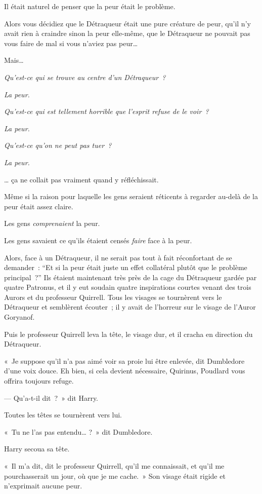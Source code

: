 Il était naturel de penser que la peur était le problème.

Alors vous décidiez que le Détraqueur était une pure créature de peur, qu'il n'y avait rien à craindre sinon la peur elle-même, que le Détraqueur ne pouvait pas vous faire de mal si vous n'aviez pas peur…

Mais…

\emph{Qu'est-ce qui se trouve au centre d'un Détraqueur~?}

\emph{La peur.}

\emph{Qu'est-ce qui est tellement horrible que l'esprit refuse de le voir~?}

\emph{La peur.}

\emph{Qu'est-ce qu'on ne peut pas tuer~?}

\emph{La peur.}

… ça ne collait pas vraiment quand y réfléchissait.

Même si la raison pour laquelle les gens seraient réticents à regarder au-delà de la peur était assez claire.

Les gens \emph{comprenaient} la peur.

Les gens savaient ce qu'ils étaient censés \emph{faire} face à la peur.

Alors, face à un Détraqueur, il ne serait pas tout à fait réconfortant de se demander~: “Et si la peur était juste un effet collatéral plutôt que le problème principal~?”
Ils étaient maintenant très près de la cage du Détraqueur gardée par quatre Patronus, et il y eut soudain quatre inspirations courtes venant des trois Aurors et du professeur Quirrell.
Tous les visages se tournèrent vers le Détraqueur et semblèrent écouter~; il y avait de l'horreur sur le visage de l'Auror Goryanof.

Puis le professeur Quirrell leva la tête, le visage dur, et il cracha en direction du Détraqueur.

«~Je suppose qu'il n'a pas aimé voir sa proie lui être enlevée, dit Dumbledore d'une voix douce.
Eh bien, si cela devient nécessaire, Quirinus, Poudlard vous offrira toujours refuge.

--- Qu'a-t-il dit~?~»
dit Harry.

Toutes les têtes se tournèrent vers lui.

«~Tu ne l'as pas entendu…
?~» dit Dumbledore.

Harry secoua sa tête.

«~Il m'a dit, dit le professeur Quirrell, qu'il me connaissait, et qu'il me pourchasserait un jour, où que je me cache.~»
Son visage était rigide et n'exprimait aucune peur.

